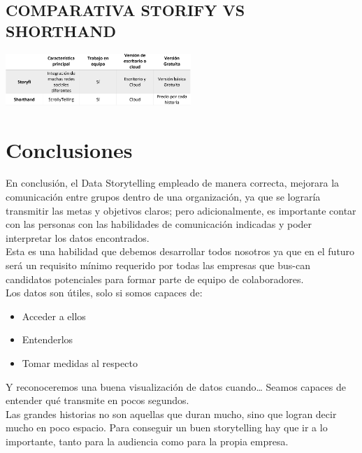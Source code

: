 \documentclass[twoside,twocolumn]{article}
\begin{document}
\subsection{COMPARATIVA STORIFY VS SHORTHAND}
\begin{center}
    \includegraphics[width=7cm]{./img/img3.png}
\end{center}


\section{Conclusiones}
En conclusión, el Data Storytelling empleado de manera correcta, mejorara la comunicación entre grupos dentro de una organización, ya que se lograría transmitir las metas y objetivos claros; pero adicionalmente, es importante contar con las personas con las habilidades de comunicación indicadas y poder interpretar los datos encontrados.\\[0.1in]
Esta es una habilidad que debemos desarrollar todos nosotros ya que en el futuro será un requisito mínimo requerido por todas las empresas que bus-can candidatos potenciales para formar parte de equipo de colaboradores.\\[0.1in]
Los datos son útiles, solo si somos capaces de:
\begin{itemize}	
    \item Acceder a ellos
    \item Entenderlos
    \item Tomar medidas al respecto
\end{itemize}
Y reconoceremos una buena visualización de datos cuando… Seamos capaces de entender qué transmite en pocos segundos.\\[0.1in]
Las grandes historias no son aquellas que duran mucho, sino que logran decir mucho en poco espacio. Para conseguir un buen storytelling hay que ir a lo importante, tanto para la audiencia como para la propia empresa.

\end{document}
